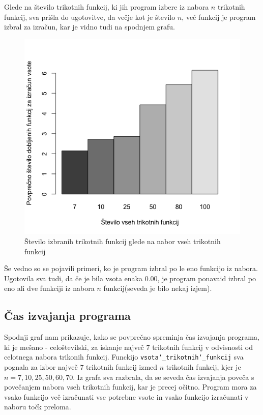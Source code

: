 \documentclass[11pt]{article}
\theoremstyle{definition}
\newcommand{\1}{\mathbbm{1}}
\begin{document}
Glede na število trikotnih funkcij, ki jih program izbere iz nabora $n$ trikotnih funkcij, sva prišla do ugotovitve, da večje kot je število $n$, več funkcij je program izbral za izračun, kar je vidno tudi na spodnjem grafu. \\
\begin{figure}[h!]
	\centering
	\includegraphics[scale=0.45]{st_funkcij.png}
	\caption{Število izbranih trikotnih funkcij glede na nabor vseh trikotnih funkcij}
\end{figure}	

\newpage
Še vedno so se pojavili primeri, ko je program izbral po le eno funkcijo iz nabora. 
Ugotovila sva tudi, da če je bila vsota enaka $0.00$, je program ponavaid izbral po eno ali dve funkciji iz nabora $n$ funkcij(seveda je bilo nekaj izjem).\\

\subsection{Čas izvajanja programa}
\vspace{0.5cm}

Spodnji graf nam prikazuje, kako se povprečno spreminja čas izvajanja programa, ki je mešano - celoštevilski, za iskanje največ $7$ trikotnih funkcij v odvisnosti od celotnega nabora trikonih funkcij. 
Funckijo \texttt{vsota\char`_trikotnih\char`_funkcij} sva pognala za izbor največ $7$ trikotnih funkcij izmed $n$ trikotnih funkcij, kjer je $n = {7, 10, 25, 50, 60, 70}$.
Iz grafa sva razbrala, da se seveda čas izvajanja poveča s povečanjem nabora vseh trikotnih funkcij, kar je precej očitno. Program mora za vsako funkcijo več izračunati vse potrebne vsote in vsako funkcijo izračunati v naboru točk preloma. \\
\end{document}
